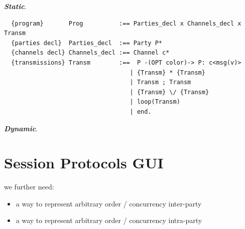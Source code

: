 \documentclass[acmsmall,10pt,review,anonymous]{acmart}\settopmatter{printfolios=true}
\begin{document}
\noindent
\emph{\bf Static}.
\begin{verbatim}
  {program}       Prog          :== Parties_decl x Channels_decl x Transm
  {parties decl}  Parties_decl  :== Party P*
  {channels decl} Channels_decl :== Channel c*
  {transmissions} Transm        :==  P -(OPT color)-> P: c<msg(v)>
                                   | {Transm} * {Transm}
                                   | Transm ; Transm
                                   | {Transm} \/ {Transm}
                                   | loop(Transm)
                                   | end.
\end{verbatim}

\emph{\bf Dynamic}.


\section{Session Protocols GUI}


we further need:
\begin{itemize}
  \item a way to represent arbitrary order / concurrency inter-party
  \item a way to represent arbitrary order / concurrency intra-party
\end{itemize}








%
\end{document}
